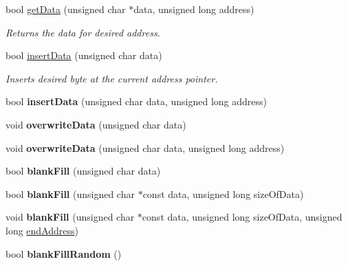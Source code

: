 \begin{DoxyCompactItemize}
bool \hyperlink{classintelhex_a6596b518a9a832ed8e6ba21a0e07861c}{get\-Data} (unsigned char $\ast$data, unsigned long address)
\begin{DoxyCompactList}\small\item\em Returns the data for desired address. \end{DoxyCompactList}\item 
bool \hyperlink{classintelhex_a71096983db3c24a5ac9b95663937a4ce}{insert\-Data} (unsigned char data)
\begin{DoxyCompactList}\small\item\em Inserts desired byte at the current address pointer. \end{DoxyCompactList}\item 
\hypertarget{classintelhex_a00ff4c491fabc5ef207071358e1b9298}{bool {\bfseries insert\-Data} (unsigned char data, unsigned long address)}\label{classintelhex_a00ff4c491fabc5ef207071358e1b9298}

\item 
\hypertarget{classintelhex_ab4fc2715f4c63d3f31e8d2b0533583e5}{void {\bfseries overwrite\-Data} (unsigned char data)}\label{classintelhex_ab4fc2715f4c63d3f31e8d2b0533583e5}

\item 
\hypertarget{classintelhex_a83edcd2329cb52a4bab6bb46463184d7}{void {\bfseries overwrite\-Data} (unsigned char data, unsigned long address)}\label{classintelhex_a83edcd2329cb52a4bab6bb46463184d7}

\item 
\hypertarget{classintelhex_a5de5cf10103fc307127f9017f3e5cd76}{bool {\bfseries blank\-Fill} (unsigned char data)}\label{classintelhex_a5de5cf10103fc307127f9017f3e5cd76}

\item 
\hypertarget{classintelhex_a84bbd449bb55e218b62ea73e2b399196}{bool {\bfseries blank\-Fill} (unsigned char $\ast$const data, unsigned long size\-Of\-Data)}\label{classintelhex_a84bbd449bb55e218b62ea73e2b399196}

\item 
\hypertarget{classintelhex_aaf6f77af7a82623ef16471f105ac3fe7}{void {\bfseries blank\-Fill} (unsigned char $\ast$const data, unsigned long size\-Of\-Data, unsigned long \hyperlink{classintelhex_a9b159bea81eb832e37f6cf88a57ca659}{end\-Address})}\label{classintelhex_aaf6f77af7a82623ef16471f105ac3fe7}

\item 
\hypertarget{classintelhex_a9c26ba3dc9dd4f3021bb6c7f6983388f}{bool {\bfseries blank\-Fill\-Random} ()}\label{classintelhex_a9c26ba3dc9dd4f3021bb6c7f6983388f}


\end{DoxyCompactItemize}
